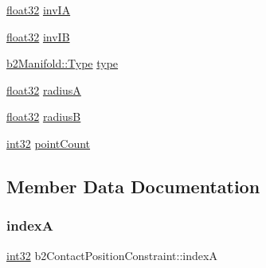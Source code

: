 \begin{DoxyCompactItemize}
\item 
\mbox{\hyperlink{b2_settings_8h_aacdc525d6f7bddb3ae95d5c311bd06a1}{float32}} \mbox{\hyperlink{structb2_contact_position_constraint_aaf92ebfd9ee6f7734199e7cf65441fdb}{inv\+IA}}
\item 
\mbox{\hyperlink{b2_settings_8h_aacdc525d6f7bddb3ae95d5c311bd06a1}{float32}} \mbox{\hyperlink{structb2_contact_position_constraint_a942566765748c8daf934a051457f4b0f}{inv\+IB}}
\item 
\mbox{\hyperlink{structb2_manifold_aa9c347e2ff2e27ee820a926efbb33e12}{b2\+Manifold\+::\+Type}} \mbox{\hyperlink{structb2_contact_position_constraint_a09f96db1c3fe5ede24395e2431e95103}{type}}
\item 
\mbox{\hyperlink{b2_settings_8h_aacdc525d6f7bddb3ae95d5c311bd06a1}{float32}} \mbox{\hyperlink{structb2_contact_position_constraint_ae75232327a6d37b0c36c2a8e12ef08b2}{radiusA}}
\item 
\mbox{\hyperlink{b2_settings_8h_aacdc525d6f7bddb3ae95d5c311bd06a1}{float32}} \mbox{\hyperlink{structb2_contact_position_constraint_a066db66f0b944b92c2666271e88e4540}{radiusB}}
\item 
\mbox{\hyperlink{b2_settings_8h_a43d43196463bde49cb067f5c20ab8481}{int32}} \mbox{\hyperlink{structb2_contact_position_constraint_a98c9f0e1e7041ed2b15370ed713b84fc}{point\+Count}}
\end{DoxyCompactItemize}


\subsection{Member Data Documentation}
\mbox{\label{structb2_contact_position_constraint_aafc38d3d582370dd5ac476646ba6a4fa}} 
\subsubsection{\texorpdfstring{indexA}{indexA}}
{\footnotesize\ttfamily \mbox{\hyperlink{b2_settings_8h_a43d43196463bde49cb067f5c20ab8481}{int32}} b2\+Contact\+Position\+Constraint\+::indexA}

\mbox{\label{structb2_contact_position_constraint_a81752f3923bf4e4fe27d58f3add0fbdb}} 
